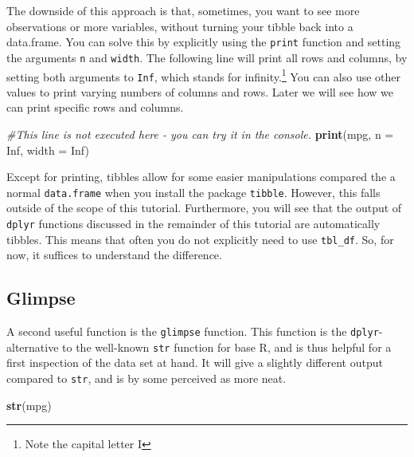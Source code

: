 \documentclass[]{tufte-book}
\newenvironment{Shaded}{}{}
\newcommand{\CommentTok}[1]{\textcolor[rgb]{0.38,0.63,0.69}{\textit{#1}}}
\newcommand{\DataTypeTok}[1]{\textcolor[rgb]{0.56,0.13,0.00}{#1}}
\newcommand{\KeywordTok}[1]{\textcolor[rgb]{0.00,0.44,0.13}{\textbf{#1}}}
\newcommand{\NormalTok}[1]{#1}
\newcommand{\OtherTok}[1]{\textcolor[rgb]{0.00,0.44,0.13}{#1}}
\begin{document}
The downside of this approach is that, sometimes, you want to see more observations or more variables, without turning your tibble back into a data.frame. You can solve this by explicitly using the \texttt{print} function and setting the arguments \texttt{n} and \texttt{width}. The following line will print all rows and columns, by setting both arguments to \texttt{Inf}, which stands for infinity.\footnote{Note the capital letter I} You can also use other values to print varying numbers of columns and rows. Later we will see how we can print specific rows and columns.

\begin{Shaded}
\begin{Highlighting}[]
\CommentTok{#This line is not executed here - you can try it in the console.}
\KeywordTok{print}\NormalTok{(mpg, }\DataTypeTok{n =} \OtherTok{Inf}\NormalTok{, }\DataTypeTok{width =} \OtherTok{Inf}\NormalTok{)}
\end{Highlighting}
\end{Shaded}

Except for printing, tibbles allow for some easier manipulations compared the a normal \texttt{data.frame} when you install the package \texttt{tibble}. However, this falls outside of the scope of this tutorial. Furthermore, you will see that the output of \texttt{dplyr} functions discussed in the remainder of this tutorial are automatically tibbles. This means that often you do not explicitly need to use \texttt{tbl\_df}. So, for now, it suffices to understand the difference.

\hypertarget{glimpse}{%
\subsection{Glimpse}\label{glimpse}}

A second useful function is the \texttt{glimpse} function. This function is the \texttt{dplyr}-alternative to the well-known \texttt{str} function for base R, and is thus helpful for a first inspection of the data set at hand. It will give a slightly different output compared to \texttt{str}, and is by some perceived as more neat.

\begin{Shaded}
\begin{Highlighting}[]
\KeywordTok{str}\NormalTok{(mpg)}
\end{Highlighting}
\end{Shaded}
\end{document}
